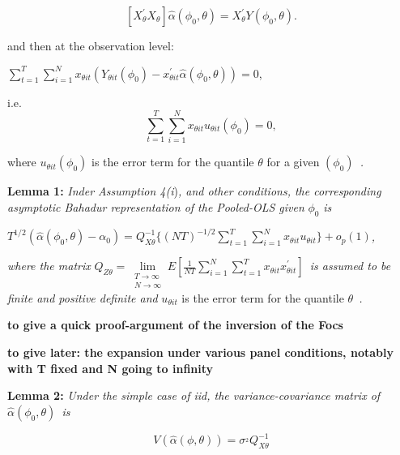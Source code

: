 \documentclass[a4paper,notitlepage,thmsb,11pt]{article}
\begin{document}
\begin{equation*}
\left[ X_{\theta }^{\prime }X_{\theta }\right] \hat{\alpha}(\phi _{0},\theta
)=X_{\theta }^{\prime }Y(\phi _{0},\theta ).
\end{equation*}

and then at the observation level:

\begin{center}
$\sum_{t=1}^{T}\sum_{i=1}^{N}x_{\theta it}(Y_{\theta it}(\phi
_{0})-x_{\theta it}^{\prime }\hat{\alpha}(\phi _{0},\theta ))=0$,
\end{center}

i.e. 
\begin{equation*}
\sum_{t=1}^{T}\sum_{i=1}^{N}x_{\theta it}u_{\theta it}(\phi _{0})=0,
\end{equation*}

\bigskip where $u_{\theta it}(\phi _{0})$ is the error term for the quantile 
$\theta $ for a given $(\phi _{0})$\textit{\ .}

\bigskip 

\textbf{Lemma 1: }\textit{Inder Assumption 4(i})\textit{, and other
conditions, the corresponding asymptotic Bahadur representation of the
Pooled-OLS given }$\phi _{0}$ \textit{is}

$T^{1/2}(\hat{\alpha}(\phi _{0},\theta )-\alpha _{0})=Q_{X\theta
}^{-1}\{(NT)^{-1/2}\sum_{t=1}^{T}\sum_{i=1}^{N}x_{\theta it}u_{\theta
it}\}+o_{p}(1)$\textit{,}

\textit{where the matrix }$Q_{Z\theta }=\lim\limits_{\substack{ T\rightarrow
\infty  \\ N\rightarrow \infty }}E\left[ \frac{1}{NT}\sum\limits_{i=1}^{N}%
\sum\limits_{t=1}^{T}x_{\theta it}x_{\theta it}^{\prime }\right] $\textit{\
is assumed to be finite and positive definite and }$u_{\theta it}$ is the
error term for the quantile $\theta $\textit{\ .}

\textbf{to give a quick proof-argument of the inversion of the Focs}

\bigskip

\textbf{to give later: the expansion under various panel conditions, notably
with T fixed and N going to infinity}

\textbf{\bigskip }

\textbf{Lemma 2: }\textit{Under the simple case of iid, the
variance-covariance matrix of }$\hat{\alpha}(\phi _{0},\theta )$\textit{\ is 
}

\begin{equation*}
\mathit{V}\left( \hat{\alpha}(\phi ,\theta )\right) \mathit{=\sigma }^{_{2}}%
\mathit{Q}_{X\theta }^{-1}
\end{equation*}
\end{document}
